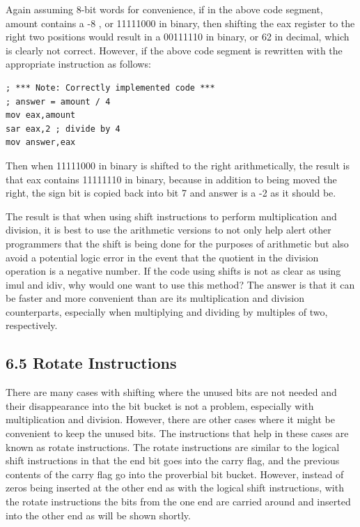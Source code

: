 \documentclass[10pt]{book}
\begin{document}
\begin{center}
\begin{center}
Again assuming 8-bit words for convenience, if in the above code segment, amount contains a -8 , or 11111000 in binary, then shifting the eax register to the right two positions would result in a 00111110 in binary, or 62 in decimal, which is clearly not correct. However, if the above code segment is rewritten with the appropriate instruction as follows:


\begin{verbatim}
; *** Note: Correctly implemented code ***
; answer = amount / 4
mov eax,amount
sar eax,2 ; divide by 4
mov answer,eax
\end{verbatim}

Then when 11111000 in binary is shifted to the right arithmetically, the result is that eax contains 11111110 in binary, because in addition to being moved the right, the sign bit is copied back into bit 7 and answer is a -2 as it should be.

The result is that when using shift instructions to perform multiplication and division, it is best to use the arithmetic versions to not only help alert other programmers that the shift is being done for the purposes of arithmetic but also avoid a potential logic error in the event that the quotient in the division operation is a negative number. If the code using shifts is not as clear as using imul and idiv, why would one want to use this method? The answer is that it can be faster and more convenient than are its multiplication and division counterparts, especially when multiplying and dividing by multiples of two, respectively.

\subsection*{6.5 Rotate Instructions}
There are many cases with shifting where the unused bits are not needed and their disappearance into the bit bucket is not a problem, especially with multiplication and division. However, there are other cases where it might be convenient to keep the unused bits. The instructions that help in these cases are known as rotate instructions. The rotate instructions are similar to the logical shift instructions in that the end bit goes into the carry flag, and the previous contents of the carry flag go into the proverbial bit bucket. However, instead of zeros being inserted at the other end as with the logical shift instructions, with the rotate instructions the bits from the one end are carried around and inserted into the other end as will be shown shortly.


\end{center}
\end{center}
\end{document}

